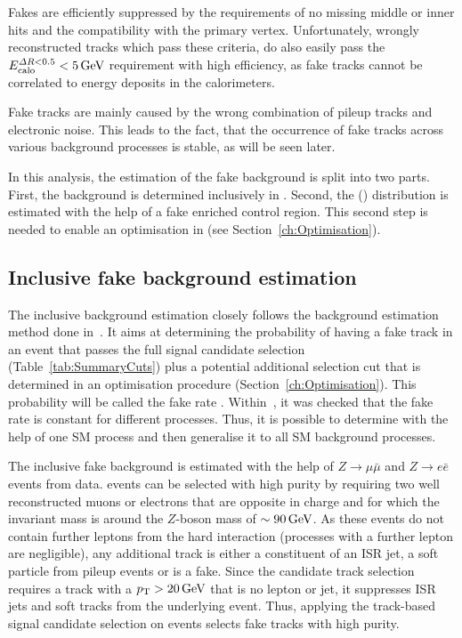 Fakes are efficiently suppressed by the requirements of no missing middle or inner hits and the compatibility with the primary vertex.
Unfortunately, wrongly reconstructed tracks which pass these criteria, do also easily pass the $E^{\Delta R<0.5}_{\text{calo}}<5\,\text{Ge}\kern-0.06667em\text{V}$ requirement with high efficiency, as fake tracks cannot be correlated to energy deposits in the calorimeters. 

Fake tracks are mainly caused by the wrong combination of pileup tracks and electronic noise.
This leads to the fact, that the occurrence of fake tracks across various background processes is stable, as will be seen later.

In this analysis, the estimation of the fake background is split into two parts.
First, the background is determined inclusively in \dedx.
Second, the \dedx (\ias) distribution is estimated with the help of a fake enriched control region. 
This second step is needed to enable an optimisation in \dedx (see Section~\ref{ch:Optimisation}).


\subsection{Inclusive fake background estimation}
The inclusive background estimation closely follows the background estimation method done in~\cite{bib:CMS:DT_Thesis,bib:CMS:DT_8TeV_AN}.
It aims at determining the probability of having a fake track in an event that passes the full signal candidate selection (Table~\ref{tab:SummaryCuts}) plus a potential additional \pt selection cut that is determined in an
optimisation procedure (Section~\ref{ch:Optimisation}).
This probability will be called the fake rate \fakerate.
Within~\cite{bib:CMS:DT_Thesis,bib:CMS:DT_8TeV_AN}, it was checked that the fake rate is constant for different processes. 
Thus, it is possible to determine \fakerate with the help of one SM process and then generalise it to all SM background processes.


The inclusive fake background is estimated with the help of $Z\rightarrow\mu\bar{\mu}$ and $Z\rightarrow e\bar{e}$ events from data.
\Zlep events can be selected with high purity by requiring two well reconstructed muons or electrons that are opposite in charge and for which the invariant mass is around the $Z$-boson mass of $\sim90\,\text{Ge}\kern-0.06667em\text{V}$.
As these events do not contain further leptons from the hard interaction (processes with a further lepton are negligible), any additional track is either a constituent of an ISR jet, a soft particle from pileup events or is a fake. 
Since the candidate track selection requires a track with a $p_{\text{T}}>20\,\text{Ge}\kern-0.06667em\text{V}$ that is no lepton or jet, it suppresses ISR jets and soft tracks from the underlying event.
Thus, applying the track-based signal candidate selection on \Zlep events selects fake tracks with high purity.


